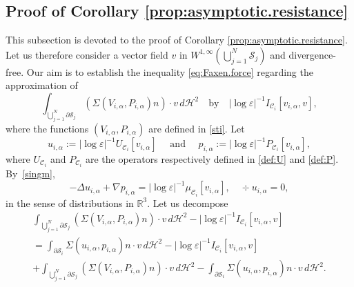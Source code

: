\documentclass[11pt]{article}
\let\oldbigcup\bigcup
\newcommand{\R}{\mathbb{R}}
\let\eps\varepsilon
\theoremstyle{definition}
\theoremstyle{remark}
\begin{document}
\subsection{Proof of Corollary \ref{prop:asymptotic.resistance}}
\label{sec-prop:asymptotic.resistance}
This subsection is devoted to the proof of Corollary \ref{prop:asymptotic.resistance}.
Let us therefore consider a vector field $v $ in $W^{1,\infty}(\bigcup_{j=1}^N \mathcal S_j)$ and divergence-free.
Our aim is to establish the inequality \eqref{eq:Faxen.force}
regarding the approximation of
\begin{equation}
\int_{\oldbigcup_{j=1}^N \partial \mathcal S_j} (\Sigma (V_{i,\alpha}, P_{i,\alpha}) n) \cdot v \, d\mathcal{H}^2 \quad \text{by} \quad
\left|\log \eps\right|^{-1}
I_{\mathcal{C}_i } [v_{i,\alpha}, v], \end{equation}
where the functions $(V_{i,\alpha},P_{i,\alpha})$ are defined in \eqref{sti}.
Let
\begin{equation}
u_{i,\alpha} := \left|\log \eps\right|^{-1} U_{\mathcal C_i}[v_{i,\alpha}] \quad \text{ and } \quad
p_{i,\alpha} := \left|\log \eps\right|^{-1} P_{\mathcal C_i}[v_{i,\alpha}],
\end{equation}
where $U_{\mathcal C_i}$ and $P_{\mathcal C_i}$ are the operators respectively defined in \eqref{def:U} and \eqref{def:P}. By~\eqref{singm},
\begin{equation}
\label{dela}
-\Delta u_{i,\alpha} + \nabla p_{i,\alpha} = \left|\log \eps\right|^{-1} \mu_{\mathcal C_i}[v_{i,\alpha}], \quad \div u_{i,\alpha} = 0,
\end{equation}
in the sense of distributions in $\R^3$.
Let us decompose
\begin{multline}
\label{decompos}
\int_{\oldbigcup_{j=1}^N \partial \mathcal S_j} (\Sigma (V_{i,\alpha}, P_{i,\alpha}) n) \cdot v \, d\mathcal{H}^2 - \left|\log \eps\right|^{-1}
I_{\mathcal{C}_i } [v_{i,\alpha}, v]
\\
= \int_{\partial \mathcal S_{i}} \Sigma(u_{i,\alpha},p_{i,\alpha}) n \cdot v \, d\mathcal{H}^2
- \left|\log \eps\right|^{-1} I_{\mathcal{C}_i } [v_{i,\alpha},v]
\\ + \int_{\oldbigcup_{j=1}^N \partial \mathcal S_j} (\Sigma (V_{i,\alpha}, P_{i,\alpha}) n) \cdot v \, d\mathcal{H}^2 - \int_{\partial \mathcal S_{i}} \Sigma(u_{i,\alpha},p_{i,\alpha}) n \cdot v \, d\mathcal{H}^2.
\end{multline}
\end{document}
